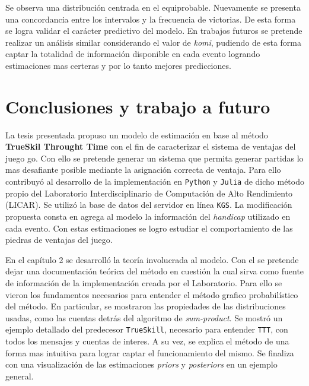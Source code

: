 \documentclass[11pt,twoside, spanish]{report} %
\begin{document}
Se observa una distribuci\'on centrada en el equiprobable.
Nuevamente se presenta una concordancia entre los intervalos y la frecuencia de victorias.
De esta forma se logra validar el car\'acter predictivo del modelo.
En trabajos futuros se pretende realizar un an\'alisis similar considerando el valor de \textit{komi}, pudiendo de esta forma captar la totalidad de informaci\'on disponible en cada evento logrando estimaciones mas certeras y por lo tanto mejores predicciones.


\chapter{Conclusiones y trabajo a futuro}








La tesis presentada propuso un modelo de estimaci\'on en base al m\'etodo \textbf{TrueSkil Throught Time} con el fin de caracterizar el sistema de ventajas del juego go.
Con ello se pretende generar un sistema que permita generar partidas lo mas desafiante posible mediante la asignaci\'on correcta de ventaja.
Para ello contribuy\'o al desarrollo de la implementaci\'on en \texttt{Python} y \texttt{Julia} de dicho m\'etodo propio del Laboratorio Interdisciplinario de Computaci\'on de Alto Rendimiento (LICAR).
Se utiliz\'o la base de datos del servidor en l\'inea \texttt{KGS}.
La modificaci\'on propuesta consta en agrega al modelo la informaci\'on del  \textit{handicap} utilizado en cada evento.
Con estas estimaciones se logro estudiar el comportamiento de las piedras de ventajas del juego.

En el cap\'itulo 2 se desarroll\'o la teor\'ia involucrada al modelo.
Con el se pretende dejar una documentaci\'on te\'orica del m\'etodo en cuesti\'on la cual sirva como fuente de informaci\'on de la implementaci\'on creada por el Laboratorio.
Para ello se vieron los fundamentos necesarios para entender el m\'etodo grafico  probabil\'istico del m\'etodo.
En particular, se mostraron las propiedades de las distribuciones usadas, como las cuentas detr\'as del algoritmo de \textit{sum-product}.
Se mostr\'o un ejemplo detallado del predecesor \texttt{TrueSkill}, necesario para entender  \texttt{TTT}, con todos los mensajes y cuentas de interes.
A su vez, se explica el m\'etodo de una forma mas intuitiva para lograr captar el funcionamiento del mismo.
Se finaliza con una visualizaci\'on de las estimaciones \textit{priors} y \textit{posteriors} en un ejemplo general. 
\end{document}
